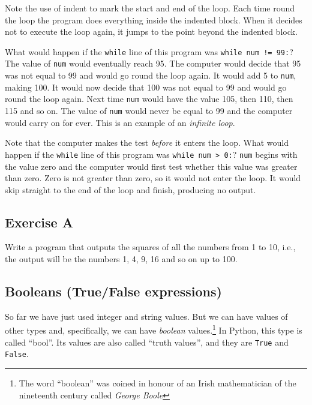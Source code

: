 Note the use of %
indent to mark the start and end of the loop.
Each time round the loop the program does everything inside
the indented block.
When it decides not to execute the loop again, it jumps to the point
beyond the indented block.

What would happen if the \texttt{while} line of this program was
\texttt{while num != 99:}?
The value of \texttt{num} would eventually reach 95.  The computer would
decide that 95 was not equal to 99 and would go round the loop again.
It would add 5 to \texttt{num}, making 100.
It would now decide that 100 was not equal to 99 and would go round the
loop again.  Next time \texttt{num} would have the value 105, then 110,
then 115 and so on.  The value of \texttt{num} would never be equal to 99
and the computer would carry on for ever.  This is an example of
an \emph{infinite loop}.

Note that the computer makes the test \emph{before} it enters the loop.
What would happen if the \texttt{while} line of this program was
\texttt{while num > 0:}?
\texttt{num} begins with the value zero and the computer would first
test whether this value was greater than zero.  Zero is not greater than
zero, so it would not enter the loop.  It would skip straight to the end
of the loop and finish, producing no output.


\subsection*{Exercise A}

Write a program that outputs the squares of all the numbers from 1 to
10, i.e., the output will be the numbers 1, 4, 9, 16 and so on up to 100.

\subsection{Booleans (True/False expressions)}

So far we have just used integer and string values.  But we can
have values of other types and, specifically, we can have
\emph{boolean} values.\footnote{The word ``boolean'' was coined in honour of an
Irish mathematician of the nineteenth century called \emph{George Boole}}
In Python, this type is called ``bool''. Its values are also called
``truth values'', and they are
\texttt{True} and \texttt{False}.


